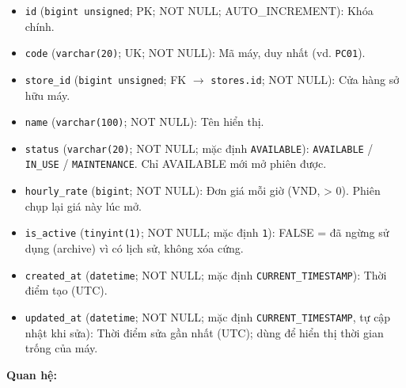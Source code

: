 \begin{itemize}

\item \texttt{id} (\texttt{bigint unsigned}; PK; NOT NULL; AUTO_INCREMENT): Khóa chính.

\item \texttt{code} (\texttt{varchar(20)}; UK; NOT NULL): Mã máy, duy nhất (vd. \texttt{PC01}).

\item \texttt{store\_id} (\texttt{bigint unsigned}; FK $\rightarrow$ \texttt{stores.id}; NOT NULL): Cửa hàng sở hữu máy.

\item \texttt{name} (\texttt{varchar(100)}; NOT NULL): Tên hiển thị.

\item \texttt{status} (\texttt{varchar(20)}; NOT NULL; mặc định \texttt{AVAILABLE}): \texttt{AVAILABLE} / \texttt{IN\_USE} / \texttt{MAINTENANCE}. Chỉ AVAILABLE mới mở phiên được.

\item \texttt{hourly\_rate} (\texttt{bigint}; NOT NULL): Đơn giá mỗi giờ (VND, > 0). Phiên chụp lại giá này lúc mở.

\item \texttt{is\_active} (\texttt{tinyint(1)}; NOT NULL; mặc định \texttt{1}): FALSE = đã ngừng sử dụng (archive) vì có lịch sử, không xóa cứng.

\item \texttt{created\_at} (\texttt{datetime}; NOT NULL; mặc định \texttt{CURRENT\_TIMESTAMP}): Thời điểm tạo (UTC).

\item \texttt{updated\_at} (\texttt{datetime}; NOT NULL; mặc định \texttt{CURRENT\_TIMESTAMP}, tự cập nhật khi sửa): Thời điểm sửa gần nhất (UTC); dùng để hiển thị thời gian trống của máy.

\end{itemize}

\textbf{Quan hệ:}

